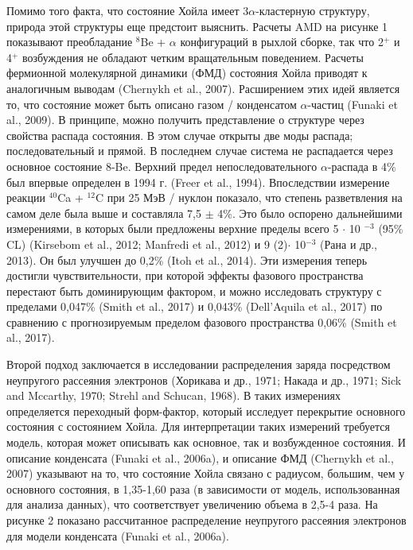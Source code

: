 \documentclass[fontsize=14pt]{scrreport}
\begin{document}
Помимо того факта, что состояние Хойла имеет 3$\alpha$-кластерную структуру, природа этой структуры еще предстоит выяснить. Расчеты AMD на рисунке 1 показывают преобладание $^{8}$Be + $\alpha$ конфигураций в рыхлой сборке, так что 2$^{+}$ и 4$^{+}$ возбуждения не обладают четким вращательным поведением. Расчеты фермионной молекулярной динамики (ФМД) состояния Хойла приводят к аналогичным выводам (Chernykh et al., 2007). Расширением этих идей является то, что состояние может быть описано газом / конденсатом $\alpha$-частиц (Funaki et al., 2009). В принципе, можно получить представление о структуре через свойства распада состояния. В этом случае открыты две моды распада; последовательный и прямой. В последнем случае система не распадается через основное состояние 8-Be. Верхний предел непоследовательного $\alpha$-распада в 4\% был впервые определен в 1994 г. (Freer et al., 1994). Впоследствии измерение реакции $^{40}$Ca + $^{12}$C при 25 МэВ / нуклон показало, что степень разветвления на самом деле была выше и составляла 7,5 $\pm$ 4\%. Это было оспорено дальнейшими измерениями, в которых были предложены верхние пределы всего 5 $\cdot$ 10 $^{-3}$ (95\% CL) (Kirsebom et al., 2012; Manfredi et al., 2012) и 9 (2)$\cdot$ 10$^{-3}$ (Рана и др., 2013). Он был улучшен до 0,2\% (Itoh et al., 2014). Эти измерения теперь достигли чувствительности, при которой эффекты фазового пространства перестают быть доминирующим фактором, и можно исследовать структуру с пределами 0,047\% (Smith et al., 2017) и 0,043\% (Dell'Aquila et al., 2017) по сравнению с прогнозируемым пределом фазового пространства 0,06\% (Smith et al., 2017).

Второй подход заключается в исследовании распределения заряда посредством неупругого рассеяния электронов (Хорикава и др., 1971; Накада и др., 1971; Sick and Mccarthy, 1970; Strehl and Schucan, 1968). В таких измерениях определяется переходный форм-фактор, который исследует перекрытие основного состояния с состоянием Хойла. Для интерпретации таких измерений требуется модель, которая может описывать как основное, так и возбужденное состояния. И описание конденсата (Funaki et al., 2006a), и описание ФМД (Chernykh et al., 2007) указывают на то, что состояние Хойла связано с радиусом, большим, чем у основного состояния, в 1,35-1,60 раза (в зависимости от модель, использованная для анализа данных), что соответствует увеличению объема в 2,5-4 раза. На рисунке 2 показано рассчитанное распределение неупругого рассеяния электронов для модели конденсата (Funaki et al., 2006a).
\end{document}
